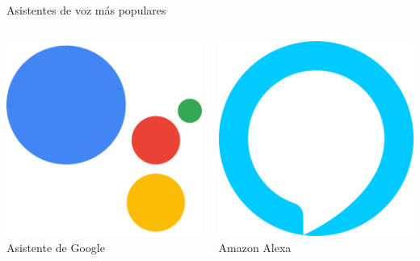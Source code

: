 \documentclass{beamer}
\begin{document}
  \begin{frame}[c]{Asistentes de voz más populares}
    \vspace{1em}
    \begin{columns}[c]
      \begin{column}{.5\textwidth}
        \centering
        \includegraphics[scale=.207]{asistente-google-logo.png}\\
        Asistente de Google
      \end{column}
      \begin{column}{.5\textwidth}
        \centering
        \includegraphics[scale=4.3]{amazon-alexa.png}\\
        Amazon Alexa
      \end{column}
    \end{columns}


\end{frame}
\end{document}
